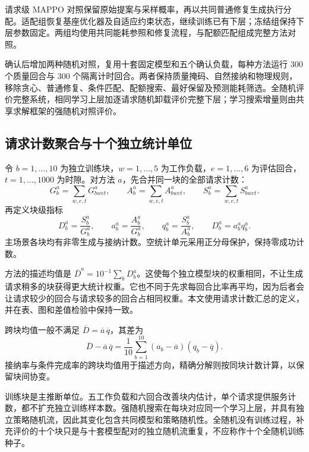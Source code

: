 请求级 MAPPO 对照保留原始提案与采样概率，再以共同普通修复生成执行分配。适配组恢复基座优化器及自适应约束状态，继续训练已有下层；冻结组保持下层参数固定。两组均使用共同能耗参照和修复流程，与配额匹配组成完整方法对照。

确认后增加两种随机对照，复用十套固定模型和五个确认负载，每种方法运行 $300$ 个质量回合与 $300$ 个隔离计时回合。两者保持质量掩码、自然接纳和物理规则，移除贪心、普通修复、条件匹配、配额搜索、最好保留及预测能耗筛选。全随机评价完整系统，相同学习上层加逐请求随机卸载评价完整下层；学习搜索增量则由共享求解框架的强随机对照评价。

\subsection{请求计数聚合与十个独立统计单位}

令 $b=1,\ldots,10$ 为独立训练块，$w=1,\ldots,5$ 为工作负载，$e=1,\ldots,6$ 为评估回合，$t=1,\ldots,1000$ 为时隙。对方法 $a$，先合并同一块的全部请求计数：
\begin{equation}
 G_b^a=\sum_{w,e,t}G_{bwet}^a,\qquad
 A_b^a=\sum_{w,e,t}A_{bwet}^a,\qquad
 S_b^a=\sum_{w,e,t}S_{bwet}^a.
 \label{legacy:eq:ch5-block-counters}
\end{equation}
再定义块级指标
\begin{equation}
 D_b^a=\frac{S_b^a}{G_b^a},\qquad
 a_b^a=\frac{A_b^a}{G_b^a},\qquad
 q_b^a=\frac{S_b^a}{A_b^a},\qquad D_b^a=a_b^aq_b^a.
 \label{legacy:eq:ch5-block-metrics}
\end{equation}
主场景各块均有非零生成与接纳计数。空统计单元采用正分母保护，保持零成功计数。

方法的描述均值是 $\overline D^a=10^{-1}\sum_bD_b^a$。这使每个独立模型块的权重相同，不让生成请求稍多的块获得更大统计权重。它也不同于先求每回合比率再平均，因为后者会让请求较少的回合与请求较多的回合占相同权重。本文使用请求计数汇总的定义，并在表、图和差值检验中保持一致。

跨块均值一般不满足 $\overline D=\overline a\,\overline q$，其差为
\begin{equation}
 \overline D-\overline a\,\overline q
 =\frac1{10}\sum_{b=1}^{10}(a_b-\overline a)(q_b-\overline q).
 \label{legacy:eq:ch5-mean-product}
\end{equation}
接纳率与条件完成率的跨块均值用于描述方向，精确分解则按同块计数计算，以保留块间协变。

训练块是主推断单位。五工作负载和六回合改善块内估计，单个请求提供服务计数，都不扩充独立训练样本数。强随机搜索在每块对应同一个学习上层，并具有独立策略随机流，因此其变化包含共同模型和策略随机性。全随机没有训练过程，补充评价的十个块只是与十套模型配对的独立随机流重复，不应称作十个全随机训练种子。

